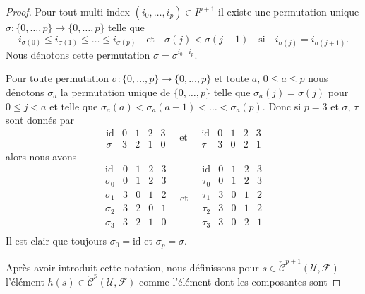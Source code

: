 \begin{proof}
Pour tout multi-index $(i_0, \ldots, i_p) \in I^{p + 1}$ il existe une permutation unique $\sigma : \{0, \ldots, p\} \to \{0, \ldots, p\}$ telle que $$
i_{\sigma(0)} \leq i_{\sigma(1)} \leq \ldots \leq i_{\sigma(p)}
\quad
\text{et}
\quad
\sigma(j) < \sigma(j + 1)
\quad
\text{si}
\quad
i_{\sigma(j)} = i_{\sigma(j + 1)}.
$$ Nous dénotons cette permutation $\sigma = \sigma^{i_0 \ldots i_p}$.

\medskip\noindent
Pour toute permutation $\sigma : \{0, \ldots, p\} \to \{0, \ldots, p\}$ et toute $a$, $0 \leq a \leq p$ nous dénotons $\sigma_a$ la permutation unique de $\{0, \ldots, p\}$ telle que $\sigma_a(j) = \sigma(j)$ pour $0 \leq j < a$ et telle que $\sigma_a(a) < \sigma_a(a + 1) < \ldots < \sigma_a(p)$. Donc si $p = 3$ et $\sigma$, $\tau$ sont donnés par $$
\begin{matrix}
\text{id} & 0 & 1 & 2 & 3 \\
\sigma & 3 & 2 & 1 & 0
\end{matrix}
\quad \text{et} \quad
\begin{matrix}
\text{id} & 0 & 1 & 2 & 3 \\
\tau & 3 & 0 & 2 & 1
\end{matrix}
$$ alors nous avons $$
\begin{matrix}
\text{id} & 0 & 1 & 2 & 3 \\
\sigma_0 & 0 & 1 & 2 & 3 \\
\sigma_1 & 3 & 0 & 1 & 2 \\
\sigma_2 & 3 & 2 & 0 & 1 \\
\sigma_3 & 3 & 2 & 1 & 0 \\
\end{matrix}
\quad \text{et} \quad
\begin{matrix}
\text{id} & 0 & 1 & 2 & 3 \\
\tau_0 & 0 & 1 & 2 & 3 \\
\tau_1 & 3 & 0 & 1 & 2 \\
\tau_2 & 3 & 0 & 1 & 2 \\
\tau_3 & 3 & 0 & 2 & 1 \\
\end{matrix}
$$ Il est clair que toujours $\sigma_0 = \text{id}$ et $\sigma_p = \sigma$.

\medskip\noindent

Après avoir introduit cette notation, nous définissons pour
$s \in \check{\mathcal{C}}^{p + 1}(\mathcal{U}, \mathcal{F})$
l'élément $h(s) \in \check{\mathcal{C}}^p(\mathcal{U}, \mathcal{F})$
comme l'élément dont les composantes sont


\end{proof}
